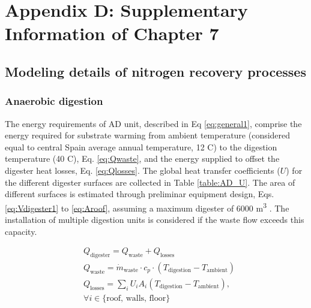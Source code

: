 \chapter{Appendix D: Supplementary Information of Chapter 7}
\begin{refsection}[referencesApD]
	
\section{Modeling details of nitrogen recovery processes}
\subsection{Anaerobic digestion}
The energy requirements of AD unit, described in Eq  \ref{eq:general1}, comprise the energy required for substrate warming from ambient temperature (considered equal to central Spain average annual temperature, 12 \textdegree C) to the digestion temperature (40 \textdegree C), Eq. \ref{eq:Qwaste}, and the energy supplied to offset the digester heat losses, Eq. \ref{eq:Qlosses}. The global heat transfer coefficients ($U$) for the different digester surfaces are collected in Table \ref{table:AD_U}. 
The area of different surfaces is estimated through preliminar equipment design, Eqs. \ref{eq:Vdigester1} to \ref{eq:Aroof}, assuming a maximum digester of 6000 m\textsuperscript{3} \citep{6000AD}. The installation of multiple digestion units is considered if the waste flow exceeds this capacity.

\begin{align}
	& Q_{\text{digester}} = Q_{\text{waste}} + Q_{\text{losses}} \label{eq:general1}\\
	& Q_{\text{waste}} = \dot{m}_{\text{waste}} \cdot c_{p} \cdot \left(T_{\text{digestion}} - T_{\text{ambient}}\right) \label{eq:Qwaste} \\
	& Q_{\text{losses}} = \sum_{i} U_{i} A_{i} \left(T_{\text{digestion}} - T_{\text{ambient}}\right)\label{eq:Qlosses}, \\
	& \forall i  \in \{\text{roof, walls, floor}\} \nonumber
\end{align}


\end{refsection}
